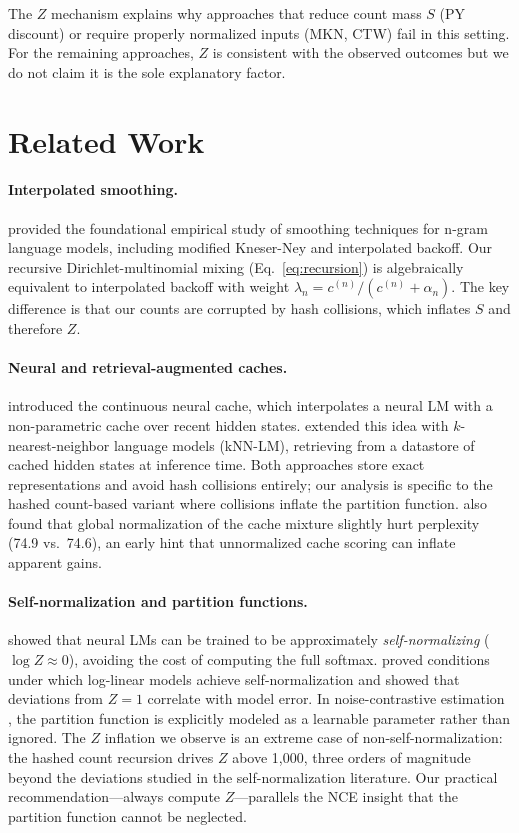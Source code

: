 \documentclass[11pt]{article}
\begin{document}
The $Z$ mechanism explains why approaches that reduce count mass $S$ (PY discount) or require properly normalized inputs (MKN, CTW) fail in this setting. For the remaining approaches, $Z$ is consistent with the observed outcomes but we do not claim it is the sole explanatory factor.

\section{Related Work}

\paragraph{Interpolated smoothing.} \citet{chen1999empirical} provided the foundational empirical study of smoothing techniques for n-gram language models, including modified Kneser-Ney and interpolated backoff. Our recursive Dirichlet-multinomial mixing (Eq.~\ref{eq:recursion}) is algebraically equivalent to interpolated backoff with weight $\lambda_n = c^{(n)}/(c^{(n)} + \alpha_n)$. The key difference is that our counts are corrupted by hash collisions, which inflates $S$ and therefore $Z$.

\paragraph{Neural and retrieval-augmented caches.} \citet{grave2017improving} introduced the continuous neural cache, which interpolates a neural LM with a non-parametric cache over recent hidden states. \citet{khandelwal2020generalization} extended this idea with $k$-nearest-neighbor language models (kNN-LM), retrieving from a datastore of cached hidden states at inference time. Both approaches store exact representations and avoid hash collisions entirely; our analysis is specific to the hashed count-based variant where collisions inflate the partition function. \citet{grave2017improving} also found that global normalization of the cache mixture slightly hurt perplexity (74.9 vs.\ 74.6), an early hint that unnormalized cache scoring can inflate apparent gains.

\paragraph{Self-normalization and partition functions.} \citet{devlin2014fast} showed that neural LMs can be trained to be approximately \emph{self-normalizing} ($\log Z \approx 0$), avoiding the cost of computing the full softmax. \citet{andreas2015when} proved conditions under which log-linear models achieve self-normalization and showed that deviations from $Z = 1$ correlate with model error. In noise-contrastive estimation \citep{mnih2012fast}, the partition function is explicitly modeled as a learnable parameter rather than ignored. The $Z$ inflation we observe is an extreme case of non-self-normalization: the hashed count recursion drives $Z$ above 1,000, three orders of magnitude beyond the deviations studied in the self-normalization literature. Our practical recommendation---always compute $Z$---parallels the NCE insight that the partition function cannot be neglected.
\end{document}
